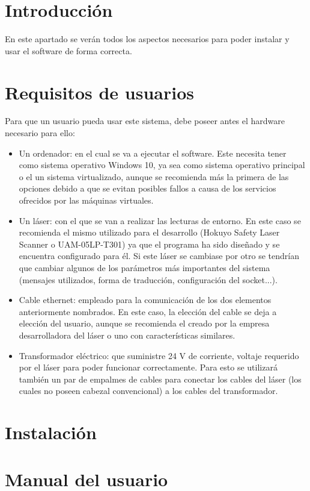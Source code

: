 
\section{Introducción}
En este apartado se verán todos los aspectos necesarios para poder instalar y usar el software de forma correcta.

\section{Requisitos de usuarios}
Para que un usuario pueda usar este sistema, debe poseer antes el hardware necesario para ello:
\begin{itemize}
	\item Un ordenador: en el cual se va a ejecutar el software. Este necesita tener como sistema operativo Windows 10, ya sea como sistema operativo principal o el un sistema virtualizado, aunque se recomienda más la primera de las opciones debido a que se evitan posibles fallos a causa de los servicios ofrecidos por las máquinas virtuales.
	\item Un láser: con el que se van a realizar las lecturas de entorno. En este caso se recomienda el mismo utilizado para el desarrollo (Hokuyo Safety Laser Scanner  o UAM-05LP-T301) ya que el programa ha sido diseñado y se encuentra configurado para él. Si este láser se cambiase por otro se tendrían que cambiar algunos de los parámetros más importantes del sistema (mensajes utilizados, forma de traducción, configuración del socket...).
	\item Cable ethernet: empleado para la comunicación de los dos elementos anteriormente nombrados. En este caso, la elección del cable se deja a elección del usuario, aunque se recomienda el creado por la empresa desarrolladora del láser o uno con características similares.
	\item Transformador eléctrico: que suministre 24 V de corriente, voltaje requerido por el láser para poder funcionar correctamente. Para esto se utilizará también un par de empalmes de cables para conectar los cables del láser (los cuales no poseen cabezal convencional) a los cables del transformador.
\end{itemize}
\section{Instalación}

\section{Manual del usuario}


